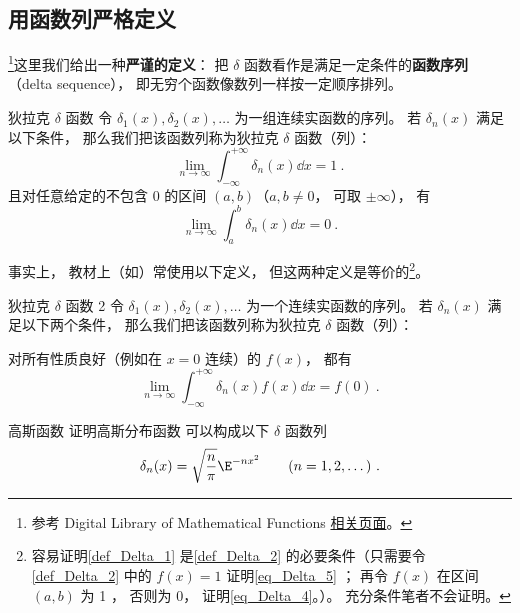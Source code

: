 \subsection{用函数列严格定义}

\footnote{参考 Digital Library of Mathematical Functions \href{https://dlmf.nist.gov/1.17}{相关页面}。}这里我们给出一种\textbf{严谨的定义}： 把 $\delta$ 函数看作是满足一定条件的\textbf{函数序列}（delta sequence）， 即无穷个函数像数列一样按一定顺序排列。
\begin{definition}{狄拉克 $\delta$ 函数}\label{def_Delta_1}
令 $\delta_1(x), \delta_2(x), \dots$ 为一组连续实函数的序列。 若 $\delta_n(x)$ 满足以下条件， 那么我们把该函数列称为狄拉克 $\delta$ 函数（列）：
\begin{equation}\label{eq_Delta_5}
\lim_{n\to\infty}\int_{-\infty}^{+\infty} \delta_n(x) \dd{x} = 1~.
\end{equation}
且对任意给定的不包含 0 的区间 $(a,b)$（$a,b \ne 0$， 可取 $\pm\infty$）， 有
\begin{equation}\label{eq_Delta_4}
\lim_{n\to\infty} \int_{a}^{b} \delta_n(x) \dd{x} = 0~.
\end{equation}
\end{definition}
事实上， 教材上（如\cite{Arfken}）常使用以下定义， 但这两种定义是等价的\footnote{容易证明\autoref{def_Delta_1} 是\autoref{def_Delta_2} 的必要条件（只需要令\autoref{def_Delta_2} 中的 $f(x) = 1$ 证明\autoref{eq_Delta_5} ； 再令 $f(x)$ 在区间 $(a,b)$ 为 1 ， 否则为 0， 证明\autoref{eq_Delta_4}。）。 充分条件笔者不会证明。}。

\begin{definition}{狄拉克 $\delta$ 函数 2}\label{def_Delta_2}
令 $\delta_1(x), \delta_2(x), \dots$ 为一个连续实函数的序列。 若 $\delta_n(x)$ 满足以下两个条件， 那么我们把该函数列称为狄拉克 $\delta$ 函数（列）：

对所有性质良好（例如在 $x = 0$ 连续）的 $f(x)$， 都有
\begin{equation}
\lim_{n\to\infty}\int_{-\infty}^{+\infty} \delta_n(x)f(x) \dd{x} = f(0)~.
\end{equation}
\end{definition}

\begin{exercise}{高斯函数}\label{exe_Delta_2}
证明高斯分布函数 可以构成以下 $\delta$ 函数列
\begin{equation}
\delta_n(x) = \sqrt{\frac{n}{\pi}} \E^{-n x^2} \qquad (n = 1, 2, \dots)~.
\end{equation}
\end{exercise}

